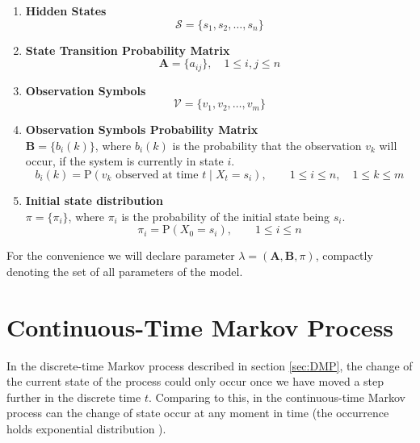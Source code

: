 \documentclass[thesis=M,english]{FITthesis}[2012/10/20]
\newcommand{\matr}[1]{\mathbf{#1}}
\begin{document}
\begin{enumerate}[resume]
\setcounter{enumi}{0}
\item \textbf{Hidden States}
\begin{equation}
\mathcal{S} = \{ s_1,s_2, \dots, s_n \}
\end{equation} 
\item \textbf{State Transition Probability Matrix}
\begin{equation}\label{eq:tp}
\matr{A} = \{ a_{ij} \}, \quad 1 \leq i,j \leq n
\end{equation} 
\item \textbf{Observation Symbols}
\begin{equation}
\mathcal{V} = \{ v_1,v_2, \dots, v_m \} 
\end{equation}
\item \textbf{Observation Symbols Probability Matrix} \\
$\matr{B} = \{ b_{i}(k) \}$, where $b_{i}(k)$ is the probability that the observation $v_k$ will occur, if the system is currently in state $i$. 
\begin{equation}
b_i(k) = \mathrm{P}(v_k \text{ observed at time }t \mid X_t = s_i), \qquad 1 \leq i \leq n, \quad 1 \leq k \leq m
\end{equation}
\item \textbf{Initial state distribution} \\
$\pi = \{ \pi_i \}$, where $\pi_i$ is the probability of the initial state being $s_i$.
\begin{equation}
\pi_{i} = \mathrm{P}(X_0 = s_i), \qquad 1 \leq i \leq n
\end{equation}
\end{enumerate}

For the convenience we will declare parameter $\lambda = (\matr{A},\matr{B},\pi)$, compactly denoting the set of all parameters of the model. 

\section{Continuous-Time Markov Process}\label{sec:ctmp}

In the discrete-time Markov process described in section \ref{sec:DMP}, the change of the current state of the process could only occur once we have moved a step further in the discrete time $t$. Comparing to this, in the continuous-time Markov process can the change of state occur at any moment in time (the occurrence holds exponential distribution ).
\end{document}
